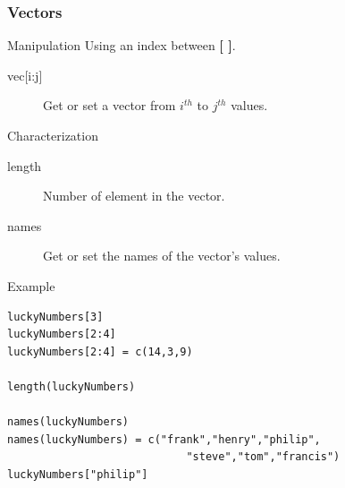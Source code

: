 \documentclass[10pt]{beamer}
\newenvironment{xframe}[2][]
  {\begin{frame}[fragile,environment=xframe,#1]
  \frametitle{#2}}
  {\end{frame}}
\begin{document}

\begin{xframe}[shrink=5]{Vectors}
  \begin{block}{Manipulation}
    Using an index between {\bf [ ]}.
    \begin{description}
    \item[{vec[i:j]} ]Get or set a {\sf vector} from $i^{th}$ to $j^{th}$ values.
    \end{description}
  \end{block}
  \begin{block}{Characterization}
    \begin{description}
    \item[length] Number of element in the {\sf vector}.
    \item[names] Get or set the names of the {\sf vector}'s values.
    \end{description}
  \end{block}
  \begin{exampleblock}{Example}
\begin{verbatim}
luckyNumbers[3]
luckyNumbers[2:4]
luckyNumbers[2:4] = c(14,3,9)

length(luckyNumbers)

names(luckyNumbers)
names(luckyNumbers) = c("frank","henry","philip",
                            "steve","tom","francis") 
luckyNumbers["philip"]
\end{verbatim}
  \end{exampleblock}
\end{xframe}

\end{document}
